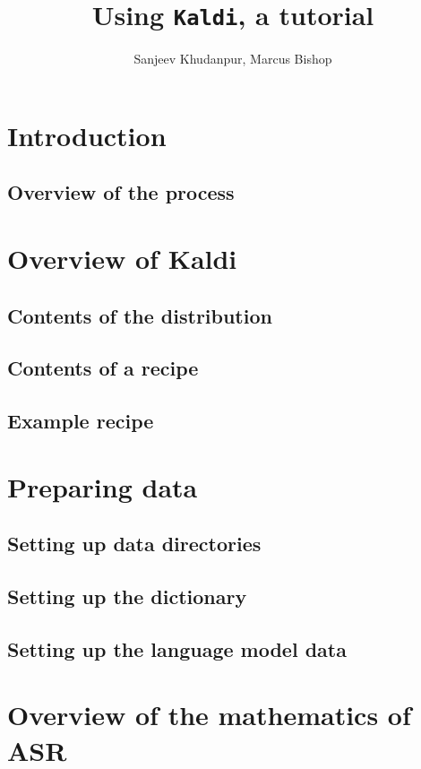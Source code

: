 \documentclass[12pt]{article}
\title{Using \texttt{Kaldi}, a tutorial}
\author{Sanjeev Khudanpur, Marcus Bishop}
\begin{document}
\maketitle

\section{Introduction}

\subsection{Overview of the process}


\section{Overview of \textsf{Kaldi}}

\subsection{Contents of the distribution}

\subsection{Contents of a recipe}

\subsection{Example recipe}


\section{Preparing data}\label{data}

\subsection{Setting up data directories}

\subsection{Setting up the dictionary}\label{dict}

\subsection{Setting up the language model data}


\section{Overview of the mathematics of ASR}

\end{document}
